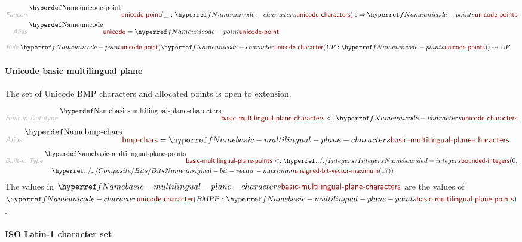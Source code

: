 \begin{align*}
  \KEY{Funcon} ~ 
  & \NAMEDECL{unicode-point}(\_ : \NAMEREF{unicode-characters}) :  \TO \NAMEREF{unicode-points}
\\
  \KEY{Alias} ~ 
  & \NAMEDECL{unicode} = \NAMEREF{unicode-point}
\end{align*}
\begin{align*}
  \KEY{Rule} ~ 
    & \NAMEREF{unicode-point}
        ( \NAMEREF{unicode-character}
            ( \VAR{UP} : \NAMEREF{unicode-points} ) ) \leadsto
        \VAR{UP}
\end{align*}
\paragraph*{Unicode basic multilingual plane}\hypertarget{unicode-basic-multilingual-plane}{}\label{unicode-basic-multilingual-plane}

The set of Unicode BMP characters and allocated points is open to extension.

\begin{align*}
  \KEY{Built-in Datatype} ~ 
  \NAMEDECL{basic-multilingual-plane-characters} <: \NAMEREF{unicode-characters}
\end{align*}
\begin{align*}
  \KEY{Alias} ~ 
  & \NAMEDECL{bmp-chars} = \NAMEREF{basic-multilingual-plane-characters}
\end{align*}
\begin{align*}
  \KEY{Built-in Type} ~  
  & \NAMEDECL{basic-multilingual-plane-points} <: \NAMEHYPER{../.}{Integers}{bounded-integers}
                                                             ( 0, \\&\quad 
                                                               \NAMEHYPER{../../Composite}{Bits}{unsigned-bit-vector-maximum}
                                                                 ( 17 ) )
\end{align*}
The values in $\SHADE{\NAMEREF{basic-multilingual-plane-characters}}$ are the values of
  $\SHADE{\NAMEREF{unicode-character}
           ( \VAR{BMPP} : \NAMEREF{basic-multilingual-plane-points} )}$.

\paragraph*{ISO Latin-1 character set}\hypertarget{iso-latin-1-character-set}{}\label{iso-latin-1-character-set}

